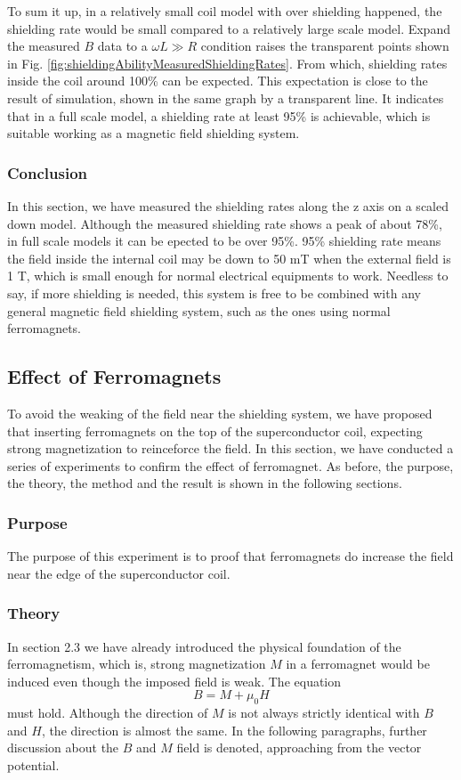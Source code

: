 To sum it up, in a relatively small coil model with over shielding happened, the shielding rate would be small compared to a relatively large scale model.
Expand the measured $B$ data to a $\omega L \gg R$ condition raises the transparent points shown in Fig. \ref{fig:shieldingAbilityMeasuredShieldingRates}.
From which, shielding rates inside the coil around 100\% can be expected.
This expectation is close to the result of simulation, shown in the same graph by a transparent line.
It indicates that in a full scale model, a shielding rate at least 95\% is achievable,
which is suitable working as a magnetic field shielding system.


\subsubsection{Conclusion}
In this section, we have measured the shielding rates along the z axis on a scaled down model.
Although the measured shielding rate shows a peak of about 78\%,
in full scale models it can be epected to be over 95\%.
95\% shielding rate means the field inside the internal coil may be down to 50 mT when the external field is 1 T,
which is small enough for normal electrical equipments to work.
Needless to say, if more shielding is needed,
this system is free to be combined with any general magnetic field shielding system, such as the ones using normal ferromagnets.


\newpage
\subsection{Effect of Ferromagnets}
To avoid the weaking of the field near the shielding system,
we have proposed that inserting ferromagnets on the top of the superconductor coil,
expecting strong magnetization to reinceforce the field.
In this section, we have conducted a series of experiments to confirm the effect of ferromagnet.
As before, the purpose, the theory, the method and the result is shown in the following sections.

\subsubsection{Purpose}
The purpose of this experiment is to proof that ferromagnets do increase the field near the edge of the superconductor coil.

\subsubsection{Theory}
In section 2.3 we have already introduced the physical foundation of the ferromagnetism,
which is,
strong magnetization $M$ in a ferromagnet would be induced even though the imposed field is weak.
The equation
\begin{equation}
  B = M + \mu_0 H
\end{equation}
must hold.
Although the direction of $M$ is not always strictly identical with $B$ and $H$,
the direction is almost the same.
In the following paragraphs, further discussion about the $B$ and $M$ field is denoted,
approaching from the vector potential.

